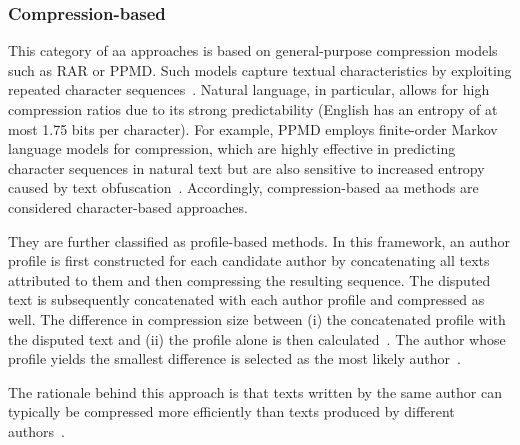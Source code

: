 \subsubsection{Compression-based}
This category of \ac{aa} approaches is based on general-purpose compression models such as RAR or PPMD. %
Such models capture textual characteristics by exploiting repeated character sequences~\citep{stamatatos_survey_2009,neal_surveying_2018}. 
Natural language, in particular, allows for high compression ratios due to its strong predictability (English has an entropy of at most 1.75 bits per character). 
For example, PPMD employs finite-order Markov language models for compression, which are highly effective in predicting character sequences in natural text but are also sensitive to increased entropy caused by text obfuscation~\citep{bevendorff_divergence_based_2020}.
Accordingly, compression-based \ac{aa} methods are considered character-based approaches.

They are further classified as profile-based methods. In this framework, an author profile is first constructed for each candidate author by concatenating all texts attributed to them and then compressing the resulting sequence. 
The disputed text is subsequently concatenated with each author profile and compressed as well. 
The difference in compression size between (i) the concatenated profile with the disputed text and (ii) the profile alone is then calculated~\citep{stamatatos_survey_2009,elmanarelbouanani_authorship_2014,neal_surveying_2018}. 
The author whose profile yields the smallest difference is selected as the most likely author~\citep{stamatatos_survey_2009,elmanarelbouanani_authorship_2014}.

The rationale behind this approach is that texts written by the same author can typically be compressed more efficiently than texts produced by different authors~\citep{stamatatos_survey_2009,elmanarelbouanani_authorship_2014}.


